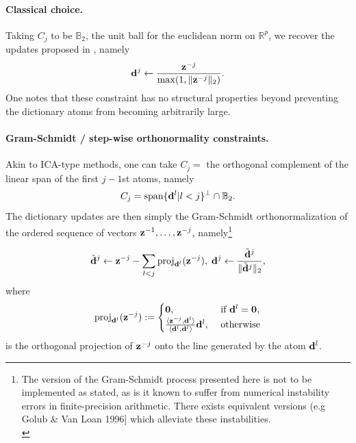 \paragraph{Classical choice.}

Taking $C_j$ to be $\mathbb B_2$, the unit ball for the euclidean norm on  $\mathbb R^p$, we recover the updates proposed in \citep{mairal2009,mairal2010}, namely
\begin{equation}
\mathbf{d}^j \leftarrow  \frac{\mathbf{z}^{-j}}{\max(1,\|\mathbf{z}^{-j}\|_2)}.
\end{equation}
One notes that these constraint has no structural properties beyond preventing the dictionary atoms from becoming arbitrarily large.

\paragraph{Gram-Schmidt / step-wise orthonormality constraints.}
Akin to ICA-type methods, one can take $C_j =$ the orthogonal complement of the linear span of the first $j-1$st atoms, namely
  \begin{equation}
    C_{j} = \text{span}\{\mathbf{d}^l | l < j\}^\perp \cap \mathbb B_{2}.
  \end{equation}
  The dictionary updates are then simply the Gram-Schmidt orthonormalization of the ordered sequence of vectors $\mathbf{z}^{-1},\ldots,\mathbf{z}^{-j}$, namely\footnote{The version of the Gram-Schmidt process presented here is not to be implemented as stated, as is it known to suffer from numerical instability errors in finite-precision arithmetic. There exists equivalent versions (e.g Golub \& Van Loan 1996] which alleviate these instabilities.\\}

  \begin{eqnarray}
    \tilde{\mathbf{d}}^j \leftarrow \mathbf{z}^{-j} -\sum_{l < j}\operatorname{proj}_{\mathbf{d}^l}(\mathbf{z}^{-j}),\;\mathbf{d}^j \leftarrow \frac{\tilde{\mathbf{d}}^j}{\|\tilde{\mathbf{d}}^j\|_2},
  \end{eqnarray}
  where
  $$
  \operatorname{proj}_{\mathbf{d}^l}(\mathbf{z}^{-j}) := \begin{cases}\textbf{0},&\mbox{ if }\mathbf{d}^l = \textbf{0},\\
    \frac{\langle \mathbf{z}^{-j},\mathbf{d}^l\rangle}{\langle \mathbf{d}^l,\mathbf{d}^l\rangle}\mathbf{d}^l,&\mbox{ otherwise}
  \end{cases}
  $$
  is the orthogonal projection of $\mathbf{z}^{-j}$ onto the line generated by the atom  $\mathbf{d}^l$.
  

